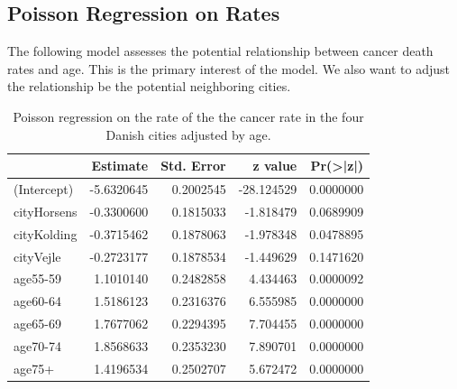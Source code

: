 \documentclass[
]{book}
\newenvironment{Shaded}{\begin{snugshade}}{\end{snugshade}}
\newcommand{\AttributeTok}[1]{\textcolor[rgb]{0.13,0.29,0.53}{#1}}
\newcommand{\FunctionTok}[1]{\textcolor[rgb]{0.13,0.29,0.53}{\textbf{#1}}}
\newcommand{\NormalTok}[1]{#1}
\newcommand{\OtherTok}[1]{\textcolor[rgb]{0.56,0.35,0.01}{#1}}
\newcommand{\SpecialCharTok}[1]{\textcolor[rgb]{0.81,0.36,0.00}{\textbf{#1}}}
\newcommand{\StringTok}[1]{\textcolor[rgb]{0.31,0.60,0.02}{#1}}
\begin{document}
\hypertarget{poisson-regression-on-rates-1}{%
\subsection{Poisson Regression on Rates}\label{poisson-regression-on-rates-1}}

The following model assesses the potential relationship between cancer death rates and age. This is the primary interest of the model. We also want to adjust the relationship be the potential neighboring cities.

\begin{Shaded}
\end{Shaded}

\begin{table}

\caption{\label{tab:unnamed-chunk-172}Poisson regression on the rate of the 
      the cancer rate in the four Danish cities adjusted by age.}
\centering
\begin{tabular}[t]{l|r|r|r|r}
\hline
  & Estimate & Std. Error & z value & Pr(>|z|)\\
\hline
(Intercept) & -5.6320645 & 0.2002545 & -28.124529 & 0.0000000\\
\hline
cityHorsens & -0.3300600 & 0.1815033 & -1.818479 & 0.0689909\\
\hline
cityKolding & -0.3715462 & 0.1878063 & -1.978348 & 0.0478895\\
\hline
cityVejle & -0.2723177 & 0.1878534 & -1.449629 & 0.1471620\\
\hline
age55-59 & 1.1010140 & 0.2482858 & 4.434463 & 0.0000092\\
\hline
age60-64 & 1.5186123 & 0.2316376 & 6.555985 & 0.0000000\\
\hline
age65-69 & 1.7677062 & 0.2294395 & 7.704455 & 0.0000000\\
\hline
age70-74 & 1.8568633 & 0.2353230 & 7.890701 & 0.0000000\\
\hline
age75+ & 1.4196534 & 0.2502707 & 5.672472 & 0.0000000\\
\hline
\end{tabular}
\end{table}
\end{document}

